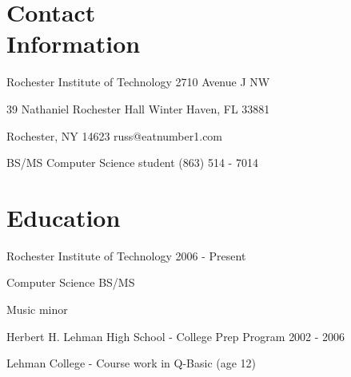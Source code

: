 \documentclass[margin,line]{resume}
\begin{document}
\begin{resume}

\section{\mysidestyle Contact \\ Information}\vspace{2mm}
	\begin{asparablank}
		\item Rochester Institute of Technology \hfill 2710 Avenue J NW
		\item 39 Nathaniel Rochester Hall \hfill Winter Haven, FL 33881
		\item Rochester, NY 14623 \hfill russ@eatnumber1.com
		\item BS/MS Computer Science student \hfill (863) 514 - 7014
	\end{asparablank}

\section{\mysidestyle Education}
		\begin{compactdesc}
			\item[Rochester Institute of Technology] \hfill {\footnotesize 2006 - Present}
			\begin{compactitem}
				\item {\small Computer Science BS/MS}
				\item {\small Music minor}
			\end{compactitem}
			\item[Herbert H. Lehman High School] - College Prep Program \hfill
			{\footnotesize 2002 - 2006}
			\item[Lehman College] - Course work in Q-Basic (age 12)
		\end{compactdesc}


\end{resume}
\end{document}
